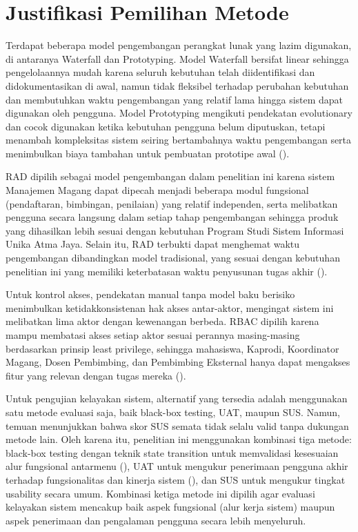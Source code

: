\section{Justifikasi Pemilihan Metode}

Terdapat beberapa model pengembangan perangkat lunak yang lazim digunakan, 
di antaranya Waterfall dan Prototyping. Model Waterfall bersifat linear sehingga 
pengelolaannya mudah karena seluruh kebutuhan telah diidentifikasi dan 
didokumentasikan di awal, namun tidak fleksibel terhadap perubahan kebutuhan 
dan membutuhkan waktu pengembangan yang relatif lama hingga sistem dapat 
digunakan oleh pengguna. Model Prototyping mengikuti pendekatan evolutionary 
dan cocok digunakan ketika kebutuhan pengguna belum diputuskan, tetapi menambah 
kompleksitas sistem seiring bertambahnya waktu pengembangan serta menimbulkan 
biaya tambahan untuk pembuatan prototipe awal (\cite{Parlika2023}).

RAD dipilih sebagai model pengembangan dalam penelitian ini karena sistem 
Manajemen Magang dapat dipecah menjadi beberapa modul fungsional 
(pendaftaran, bimbingan, penilaian) yang relatif independen, serta melibatkan 
pengguna secara langsung dalam setiap tahap pengembangan sehingga produk 
yang dihasilkan lebih sesuai dengan kebutuhan Program Studi Sistem Informasi 
Unika Atma Jaya. Selain itu, RAD terbukti dapat menghemat waktu pengembangan 
dibandingkan model tradisional, yang sesuai dengan kebutuhan penelitian ini 
yang memiliki keterbatasan waktu penyusunan tugas akhir (\cite{Parlika2023}).

Untuk kontrol akses, pendekatan manual tanpa model baku berisiko menimbulkan 
ketidakkonsistenan hak akses antar-aktor, mengingat sistem ini melibatkan 
lima aktor dengan kewenangan berbeda. RBAC dipilih karena mampu membatasi 
akses setiap aktor sesuai perannya masing-masing berdasarkan prinsip least 
privilege, sehingga mahasiswa, Kaprodi, Koordinator Magang, Dosen Pembimbing, 
dan Pembimbing Eksternal hanya dapat mengakses fitur yang relevan dengan tugas 
mereka (\cite{MSahyudi2025}).

Untuk pengujian kelayakan sistem, alternatif yang tersedia adalah menggunakan 
satu metode evaluasi saja, baik black-box testing, UAT, maupun SUS. Namun, 
temuan \cite{Fiandhika2024} menunjukkan bahwa skor SUS semata tidak 
selalu valid tanpa dukungan metode lain. Oleh karena itu, penelitian ini 
menggunakan kombinasi tiga metode: black-box testing dengan teknik state 
transition untuk memvalidasi kesesuaian alur fungsional antarmenu 
(\cite{Mintarsih2023}), UAT untuk mengukur penerimaan pengguna akhir terhadap 
fungsionalitas dan kinerja sistem (\cite{AliyahAliyah2025}), dan SUS 
untuk mengukur tingkat usability secara umum. Kombinasi ketiga metode ini 
dipilih agar evaluasi kelayakan sistem mencakup baik aspek fungsional 
(alur kerja sistem) maupun aspek penerimaan dan pengalaman pengguna secara 
lebih menyeluruh.
